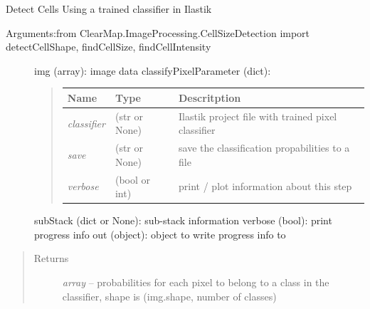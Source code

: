 \documentclass[letterpaper,10pt,english]{sphinxmanual}
\begin{document}
\begin{fulllineitems}
\label{api/ClearMap.ImageProcessing:ClearMap.ImageProcessing.IlastikClassification.classifyPixel}
Detect Cells Using a trained classifier in Ilastik
\begin{description}
\item[{Arguments:from ClearMap.ImageProcessing.CellSizeDetection import detectCellShape, findCellSize, findCellIntensity}] \leavevmode
img (array): image data
classifyPixelParameter (dict):
\begin{quote}

\begin{tabulary}{\linewidth}{|L|L|L|}
\hline
\textsf{\relax 
Name
} & \textsf{\relax 
Type
} & \textsf{\relax 
Descritption
}\\
\hline
\emph{classifier}
 & 
(str or  None)
 & 
Ilastik project file with trained pixel classifier
\\
\hline
\emph{save}
 & 
(str or None)
 & 
save the classification propabilities to a file
\\
\hline
\emph{verbose}
 & 
(bool or int)
 & 
print / plot information about this step
\\
\hline\end{tabulary}

\end{quote}

subStack (dict or None): sub-stack information
verbose (bool): print progress info
out (object): object to write progress info to

\end{description}
\begin{quote}\begin{description}
\item[{Returns}] \leavevmode
\emph{array} --
probabilities for each pixel to belong to a class in the classifier, shape is (img.shape, number of classes)

\end{description}\end{quote}

\end{fulllineitems}

\end{document}
